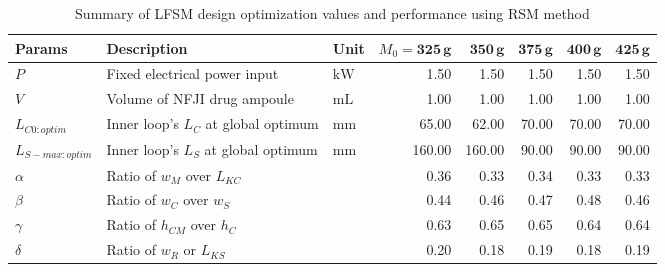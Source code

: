             
            \begin{landscape}
                \begin{table}
                    \renewcommand{\arraystretch}{1.2}
                    \caption{Summary of \acs{LFSM} design optimization values and performance using \acs{RSM} method}
                    \label{table:chap/rsm/LFSM/result for global optimization of FSM via RSM method}
                    \centering
                    \begin{tabular}{lllrrrrr}
                        \hline
                        \textbf{Params}     & \textbf{Description}                            & \textbf{Unit}           & $M_0=\mathbf{325\,g}$ & $\mathbf{350\,g}$ & $\mathbf{375\,g}$ & $\mathbf{400\,g}$ & $\mathbf{425\,g}$ \\
                        \hline
                        $P$                  & Fixed electrical power input              & $\mathrm{kW}$  & 1.50           & 1.50           & 1.50           & 1.50           & 1.50           \\
                        $V$                  & Volume of NFJI drug ampoule               & $\mathrm{mL}$  & 1.00           & 1.00           & 1.00           & 1.00           & 1.00           \\
                        \hline
                        $L_{C0:optim}$       & Inner loop's $L_C$ at global optimum      & $\mathrm{mm}$  & 65.00          & 62.00          & 70.00          & 70.00          & 70.00          \\
                        $L_{S-max:optim}$    & Inner loop's $L_S$ at global optimum      & $\mathrm{mm}$  & 160.00         & 160.00         & 90.00          & 90.00          & 90.00          \\
                        $\alpha$             & Ratio of $w_M$ over $L_{KC}$              &                & 0.36           & 0.33           & 0.34           & 0.33           & 0.33           \\
                        $\beta$              & Ratio of $w_C$ over $w_S$                 &                & 0.44           & 0.46           & 0.47           & 0.48           & 0.46           \\
                        $\gamma$             & Ratio of $h_{CM}$ over $h_C$              &                & 0.63           & 0.65           & 0.65           & 0.64           & 0.64           \\
                        $\delta$             & Ratio of $w_R$ or $L_{KS}$                &                & 0.20           & 0.18           & 0.19           & 0.18           & 0.19           \\

\end{tabular}
\end{table}
\end{landscape}
